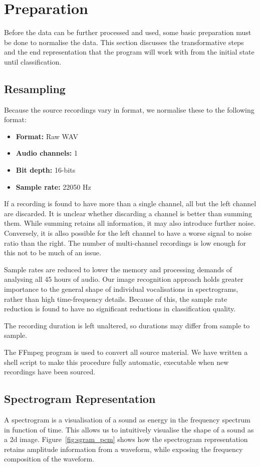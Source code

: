 \section{Preparation}\label{sec:prep}
Before the data can be further processed and used, some basic preparation
must be done to normalise the data.
This section discusses the transformative steps and the end representation that
the program will work with from the initial state until classification.

\subsection{Resampling}
Because the source recordings vary in format, we normalise these to the following
format:
\begin{itemize}[noitemsep]
  \item \textbf{Format:} Raw WAV
  \item \textbf{Audio channels:} 1
  \item \textbf{Bit depth:} 16-bits
  \item \textbf{Sample rate:} 22050 Hz
\end{itemize}

If a recording is found to have more than a single channel, all but the left
channel are discarded.
It is unclear whether discarding a channel is better than summing them.
While summing retains all information, it may also introduce further noise.
Conversely, it is allso possible for the left channel to have a worse signal to
noise ratio than the right.
The number of multi-channel recordings is low enough for this not to be much
of an issue.

Sample rates are reduced to lower the memory and processing demands of
analysing all 45 hours of audio.
Our image recognition approach holds greater importance to the general shape
of individual vocalisations in spectrograms, rather than high time-frequency
details.
Because of this, the sample rate reduction is found to have no significant
reductions in classification quality.

The recording duration is left unaltered, so durations may differ from sample to
sample.

The FFmpeg \parencite{ffmpeg} program is used to convert all source material.
We have written a shell script to make this procedure fully automatic, executable
when new recordings have been sourced.


\subsection{Spectrogram Representation}
A spectrogram is a visualisation of a sound as energy in the frequency spectrum
in function of time.
This allows us to intuitively visualise the shape of a sound as a 2d image.
Figure~\ref{fig:sgram_pcm} shows how the spectrogram representation retains
amplitude information from a waveform, while exposing the frequency composition
of the waveform.

